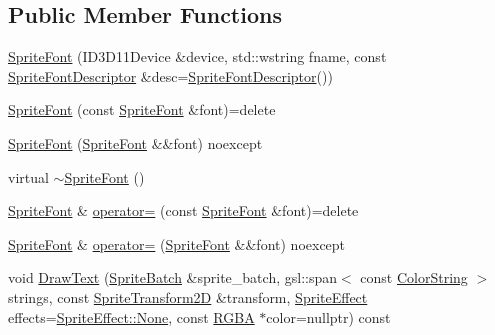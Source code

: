 \subsection*{Public Member Functions}
\begin{DoxyCompactItemize}
\item 
\mbox{\hyperlink{classmage_1_1rendering_1_1_sprite_font_ad89c07ac484130956705880fd294f200}{Sprite\+Font}} (I\+D3\+D11\+Device \&device, std\+::wstring fname, const \mbox{\hyperlink{classmage_1_1rendering_1_1_sprite_font_descriptor}{Sprite\+Font\+Descriptor}} \&desc=\mbox{\hyperlink{classmage_1_1rendering_1_1_sprite_font_descriptor}{Sprite\+Font\+Descriptor}}())
\item 
\mbox{\hyperlink{classmage_1_1rendering_1_1_sprite_font_a80cfc8c939ee3709f7a6f9441a5bd688}{Sprite\+Font}} (const \mbox{\hyperlink{classmage_1_1rendering_1_1_sprite_font}{Sprite\+Font}} \&font)=delete
\item 
\mbox{\hyperlink{classmage_1_1rendering_1_1_sprite_font_a9a2014908c6c63aa9d9ad223383bd03a}{Sprite\+Font}} (\mbox{\hyperlink{classmage_1_1rendering_1_1_sprite_font}{Sprite\+Font}} \&\&font) noexcept
\item 
virtual \mbox{\hyperlink{classmage_1_1rendering_1_1_sprite_font_a51ec0418e1456d7634c6540ccc801644}{$\sim$\+Sprite\+Font}} ()
\item 
\mbox{\hyperlink{classmage_1_1rendering_1_1_sprite_font}{Sprite\+Font}} \& \mbox{\hyperlink{classmage_1_1rendering_1_1_sprite_font_a3d0054493b983437a392c807523d744e}{operator=}} (const \mbox{\hyperlink{classmage_1_1rendering_1_1_sprite_font}{Sprite\+Font}} \&font)=delete
\item 
\mbox{\hyperlink{classmage_1_1rendering_1_1_sprite_font}{Sprite\+Font}} \& \mbox{\hyperlink{classmage_1_1rendering_1_1_sprite_font_a95317d173b64565c6cba865ca524fe2f}{operator=}} (\mbox{\hyperlink{classmage_1_1rendering_1_1_sprite_font}{Sprite\+Font}} \&\&font) noexcept
\item 
void \mbox{\hyperlink{classmage_1_1rendering_1_1_sprite_font_a66fb9548c89d55647101a304ca8a02ac}{Draw\+Text}} (\mbox{\hyperlink{classmage_1_1rendering_1_1_sprite_batch}{Sprite\+Batch}} \&sprite\+\_\+batch, gsl\+::span$<$ const \mbox{\hyperlink{classmage_1_1rendering_1_1_color_string}{Color\+String}} $>$ strings, const \mbox{\hyperlink{classmage_1_1_sprite_transform2_d}{Sprite\+Transform2D}} \&transform, \mbox{\hyperlink{namespacemage_1_1rendering_a4dbc3536c87b906f1d41d863ec458e78}{Sprite\+Effect}} effects=\mbox{\hyperlink{namespacemage_1_1rendering_a4dbc3536c87b906f1d41d863ec458e78a6adf97f83acf6453d4a6a4b1070f3754}{Sprite\+Effect\+::\+None}}, const \mbox{\hyperlink{structmage_1_1_r_g_b_a}{R\+G\+BA}} $\ast$color=nullptr) const

\end{DoxyCompactItemize}
